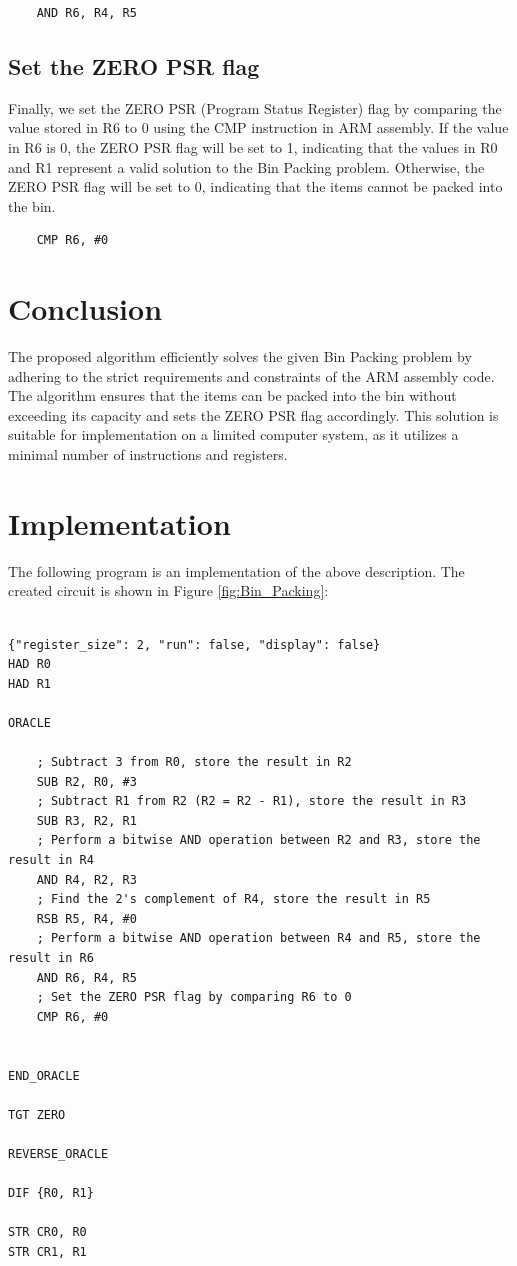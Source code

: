 \begin{verbatim}
    AND R6, R4, R5
\end{verbatim}

\subsection{Set the ZERO PSR flag}
Finally, we set the ZERO PSR (Program Status Register) flag by comparing the value stored in R6 to 0 using the CMP instruction in ARM assembly. If the value in R6 is 0, the ZERO PSR flag will be set to 1, indicating that the values in R0 and R1 represent a valid solution to the Bin Packing problem. Otherwise, the ZERO PSR flag will be set to 0, indicating that the items cannot be packed into the bin.

\begin{verbatim}
    CMP R6, #0
\end{verbatim}

\section{Conclusion}
The proposed algorithm efficiently solves the given Bin Packing problem by adhering to the strict requirements and constraints of the ARM assembly code. The algorithm ensures that the items can be packed into the bin without exceeding its capacity and sets the ZERO PSR flag accordingly. This solution is suitable for implementation on a limited computer system, as it utilizes a minimal number of instructions and registers.



\section{Implementation}

The following program is an implementation of the above description. The created circuit is shown in Figure \ref{fig:Bin_Packing}:

\begin{lstlisting}

{"register_size": 2, "run": false, "display": false}
HAD R0
HAD R1

ORACLE

    ; Subtract 3 from R0, store the result in R2
    SUB R2, R0, #3
    ; Subtract R1 from R2 (R2 = R2 - R1), store the result in R3
    SUB R3, R2, R1
    ; Perform a bitwise AND operation between R2 and R3, store the result in R4
    AND R4, R2, R3
    ; Find the 2's complement of R4, store the result in R5
    RSB R5, R4, #0
    ; Perform a bitwise AND operation between R4 and R5, store the result in R6
    AND R6, R4, R5
    ; Set the ZERO PSR flag by comparing R6 to 0
    CMP R6, #0


END_ORACLE

TGT ZERO

REVERSE_ORACLE

DIF {R0, R1}

STR CR0, R0
STR CR1, R1


\end{lstlisting}


